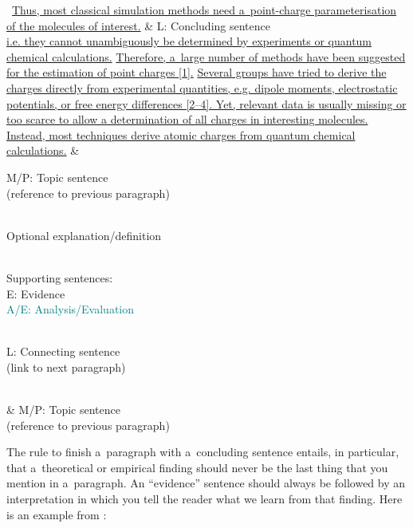 \begingroup
	\begin{longtblr}{}
		\textellipsis\ {\ul{Thus, most classical simulation methods need a~point-charge parameterisation of the molecules of interest.}}
		&
		\textcolor{DarkOrchid3}{L: Concluding sentence}
		\\
		{\ul{i.e. they cannot unambiguously be determined by experiments or quantum chemical calculations.}}
		{\ul{Therefore, a~large number of methods have been suggested for the estimation of point charges [1].}}
		{\ul{Several groups have tried to derive the charges directly from experimental quantities, e.g. dipole moments, electrostatic potentials, or free energy differences [2--4]. Yet, relevant data is usually missing or too scarce to allow a determination of all charges in interesting molecules.}}
		{\ul{Instead, most techniques derive atomic charges from quantum chemical calculations.}}%
		&
		{%
			\textcolor{Purple4}{M/P: Topic sentence \\ \textmd{(reference to previous paragraph)}} \\ \strut \\
			\textcolor{RoyalBlue4}{Optional explanation/definition} \\ \strut \\
			Supporting sentences: \\
			\textcolor{DeepPink4}{E: Evidence} \\
			\textcolor{Teal}{A/E: Analysis/Evaluation} \\ \strut \\
			\textcolor{DarkOrchid3}{L: Connecting sentence \\ \textmd{(link to next paragraph)}}%
		}
		\\
		 \textellipsis
		&
		\textcolor{Purple4}{M/P: Topic sentence \\ \textmd{(reference to previous paragraph)}}
	\end{longtblr}
\endgroup

The rule to finish a~paragraph with a~concluding sentence entails, in particular, that a~theoretical or empirical finding should never be the last thing that you mention in a~paragraph. An ``evidence'' sentence should always be followed by an interpretation in which you tell the reader what we learn from that finding. Here is an example from \citet{sigfridsson}:


